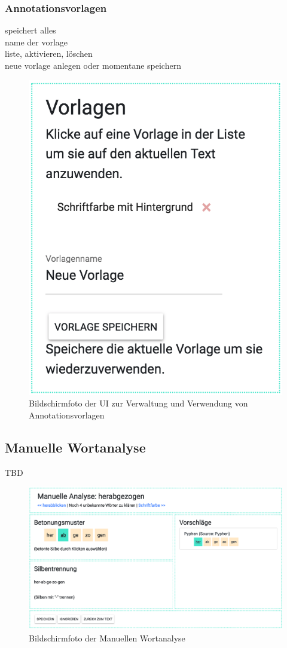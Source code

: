 \subsubsection{Annotationsvorlagen}

speichert alles\\
name der vorlage\\
liste, aktivieren, löschen\\
neue vorlage anlegen oder momentane speichern\\

\begin{figure}[h!]
	\centering
	\includegraphics[width=.4\linewidth]{figures/frontend/config-vorlagen}
	\caption{Bildschirmfoto der UI zur Verwaltung und Verwendung von Annotationsvorlagen}
	\label{fig:frontend-vorlagen}
\end{figure}

\subsection{Manuelle Wortanalyse}

TBD
\begin{figure}[h!]
	\centering
	\includegraphics[width=.8\linewidth]{figures/frontend/manuelle-analyse}
	\caption{Bildschirmfoto der Manuellen Wortanalyse}
	\label{fig:frontend-manuelle-analyse}
\end{figure}

